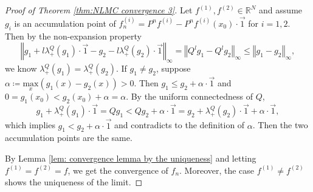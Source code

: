 \documentclass[10pt,a4paper]{amsart}
\begin{document}
\begin{proof}[Proof of Theorem \ref{thm:NLMC convergence 3}]
Let $f^{(1)},f^{(2)}\in\mathbb{R}^{N}$ and assume $g_{i}$ is an
accumulation point of $f_{n}^{(i)}=P^{n}f^{(i)}-P^{n}f^{(i)}(x_{0})\cdot \overrightarrow{1}$
for $i=1,2$. Then by the non-expansion property 
\[
\left\Vert g_{1}+l\lambda_{+}^{Q}(g_{1})\cdot \overrightarrow{1}-g_{2}-l\lambda_{+}^{Q}(g_{2})\cdot \overrightarrow{1}\right\Vert _{\infty}=\left\Vert Q^{l}g_{1}-Q^{l}g_{2}\right\Vert _{\infty}\leq\left\Vert g_{1}-g_{2}\right\Vert _{\infty},
\]
we know $\lambda_{+}^{Q}(g_{1})=\lambda_{+}^{Q}(g_{2})$. If $g_{1}\neq g_{2}$,
suppose $\alpha\coloneqq\underset{x}{\text{max}}\left(g_{1}(x)-g_{2}(x)\right)>0$.
Then $g_{1}\leq g_{2}+\alpha \cdot \overrightarrow{1}$ and $0=g_{1}(x_{0})<g_{2}(x_{0})+\alpha=\alpha$.
By the uniform connectedness of $Q$, 
\[
g_{1}+\lambda_{+}^{Q}(g_{1})\cdot \overrightarrow{1}=Qg_{1}<Qg_{2}+\alpha \cdot \overrightarrow{1}=g_{2}+\lambda_{+}^{Q}(g_{2}) \cdot \overrightarrow{1}+\alpha \cdot \overrightarrow{1},
\]
which implies $g_{1}<g_{2}+\alpha \cdot \overrightarrow{1}$ and contradicts to the definition
of $\alpha$. Then the two accumulation points are the same.

By Lemma \ref{lem: convergence lemma by the uniqueness} and letting
$f^{(1)}=f^{(2)}=f$, we get the convergence of $f_{n}$. Moreover,
the case $f^{(1)}\neq f^{(2)}$ shows the uniqueness of the limit. 
\end{proof}
\end{document}
